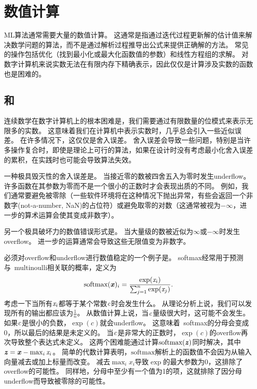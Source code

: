 \chapter{数值计算}
\label{chap:numerical_computation}

\gls{ML}算法通常需要大量的数值计算。
这通常是指通过迭代过程更新解的估计值来解决数学问题的算法，而不是通过解析过程推导出公式来提供正确解的方法。
常见的操作包括优化（找到最小化或最大化函数值的参数）和线性方程组的求解。
对数字计算机来说实数无法在有限内存下精确表示，因此仅仅是计算涉及实数的函数也是困难的。

\section{和}
\label{sec:overflow_and_underflow}
连续数学在数字计算机上的根本困难是，我们需要通过有限数量的位模式来表示无限多的实数。
这意味着我们在计算机中表示实数时，几乎总会引入一些近似误差。
在许多情况下，这仅仅是舍入误差。
舍入误差会导致一些问题，特别是当许多操作复合时，即使是理论上可行的算法，如果在设计时没有考虑最小化舍入误差的累积，在实践时也可能会导致算法失效。

一种极具毁灭性的舍入误差是。
当接近零的数被四舍五入为零时发生\gls{underflow}。
许多函数在其参数为零而不是一个很小的正数时才会表现出质的不同。
例如，我们通常要避免被零除（一些软件环境将在这种情况下抛出异常，有些会返回一个非数字(not-a-number, NaN)的占位符）或避免取零的对数（这通常被视为$-\infty$，进一步的算术运算会使其变成非数字）。


另一个极具破坏力的数值错误形式是。
当大量级的数被近似为$\infty$或$-\infty$时发生\gls{overflow}。
进一步的运算通常会导致这些无限值变为非数字。

必须对\gls{overflow}和\gls{underflow}进行数值稳定的一个例子是。
\gls{softmax}经常用于预测与~\gls{multinoulli}相关联的概率，定义为
\begin{align}
 \text{softmax}(\boldsymbol{\mathit{x}})_i = \frac{\exp(\mathit{x}_i)}{\sum_{j=1}^n \exp(\mathit{x}_j)} .
\end{align}
考虑一下当所有$\mathit{x}_i$都等于某个常数$\mathit{c}$时会发生什么。
从理论分析上说，我们可以发现所有的输出都应该为$\frac{1}{n}$。
从数值计算上说，当$\mathit{c}$量级很大时，这可能不会发生。
如果$\mathit{c}$是很小的负数，$\exp(c)$就会\gls{underflow}。
这意味着~\gls{softmax}的分母会变成0，所以最后的结果是未定义的。
当$\mathit{c}$是非常大的正数时，$\exp(c)$的\gls{overflow}再次导致整个表达式未定义。
这两个困难能通过计算$\text{softmax}(\boldsymbol{\mathit{z}})$同时解决，其中$\boldsymbol{\mathit{z}} = \boldsymbol{\mathit{x}} - \max_i \mathit{x}_i$。
简单的代数计算表明，$\text{softmax}$解析上的函数值不会因为从输入向量减去或加上标量而改变。
减去$\max_i x_i$导致$\exp$的最大参数为$0$，这排除了\gls{overflow}的可能性。
同样地，分母中至少有一个值为1的项，这就排除了因分母\gls{underflow}而导致被零除的可能性。

